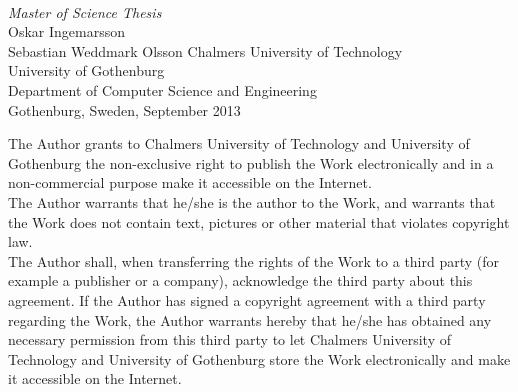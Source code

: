 \begin{titlepage}

  \mbox{}
  \vfill
  \addtolength{\voffset}{2cm}
  \begin{flushleft}
    { \\
      \emph{\Large Master of Science Thesis} \\[.8cm]
      
      {\huge Oskar Ingemarsson}\\
      {\huge Sebastian Weddmark Olsson}
      \vfill
	  {\normalsize Chalmers University of Technology \\
            University of Gothenburg \\
	    Department of Computer Science and Engineering \\
	    Gothenburg, Sweden, September 2013 \\
	  } 
    }
  \end{flushleft}

\end{titlepage}
\ClearShipoutPicture

\vspace*{2.5cm}
The Author grants to Chalmers University of Technology and University of Gothenburg  the non-exclusive right to publish the Work electronically and in a non-commercial purpose make it accessible on the Internet.\\
The Author warrants that he/she is the author to the Work, and warrants that the Work does not contain text, pictures or other material that violates copyright law. \\

The Author shall, when transferring the rights of the Work to a third party (for example a publisher or a company), acknowledge the third party about this agreement. If the Author has signed a copyright agreement with a third party regarding the Work, the Author warrants hereby that he/she has obtained any necessary permission from this third party to let Chalmers University of Technology and University of Gothenburg  store the Work electronically and make it accessible on the Internet.\\[0.6cm]


